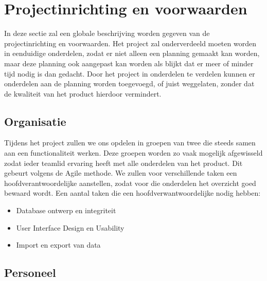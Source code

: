 \section{Projectinrichting en voorwaarden}
\label{projectinrichting}

In deze sectie zal een globale beschrijving worden gegeven van de projectinrichting en voorwaarden.
Het project zal onderverdeeld moeten worden in eenduidige onderdelen, zodat er niet alleen een planning gemaakt kan worden,
maar deze planning ook aangepast kan worden als blijkt dat er meer of minder tijd nodig is dan gedacht.
Door het project in onderdelen te verdelen kunnen er onderdelen aan de planning worden toegevoegd,
of juist weggelaten, zonder dat de kwaliteit van het product hierdoor vermindert.


\subsection{Organisatie}

Tijdens het project zullen we ons opdelen in groepen van twee die steeds samen aan een functionaliteit werken.
Deze groepen worden zo vaak mogelijk afgewisseld zodat ieder teamlid ervaring heeft met alle onderdelen van het product. Dit gebeurt volgens de Agile methode\cite{wiki:agile}.
We zullen voor verschillende taken een hoofdverantwoordelijke aanstellen, zodat voor die onderdelen het overzicht goed bewaard wordt.
Een aantal taken die een hoofdverwantwoordelijke nodig hebben:
\begin{itemize}
    \item Database ontwerp en integriteit
    \item User Interface Design en Usability
    \item Import en export van data
\end{itemize}


\subsection{Personeel}

